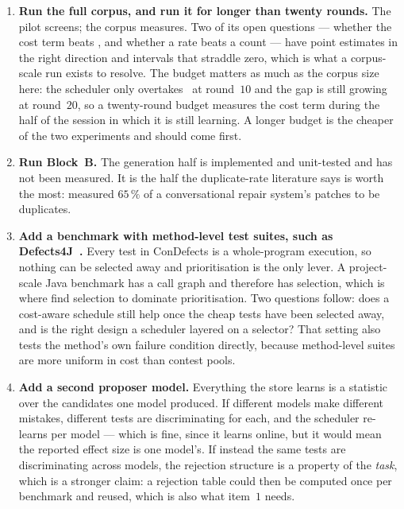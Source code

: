 \begin{enumerate}[leftmargin=*,itemsep=8pt]

\item \textbf{Run the full corpus, and run it for longer than twenty rounds.}
The pilot screens; the corpus measures. Two of its open questions --- whether
the cost term beats \frtp, and whether a rate beats a count --- have point
estimates in the right direction and intervals that straddle zero, which is
what a corpus-scale run exists to resolve. The budget matters as much as the
corpus size here: the scheduler only overtakes \frtp\ at round~$10$ and the
gap is still growing at round~$20$, so a twenty-round budget measures the cost
term during the half of the session in which it is still learning. A longer
budget is the cheaper of the two experiments and should come first.

\item \textbf{Run Block~B.} The generation half is implemented and unit-tested
and has not been measured. It is the half the duplicate-rate literature says is
worth the most: \citet{chen2025conversational} measured $65\,\%$ of a
conversational repair system's patches to be duplicates.

\item \textbf{Add a benchmark with method-level test suites, such as
Defects4J~\citep{just2014defects4j}.} Every test in ConDefects is a
whole-program execution, so nothing can be selected away and prioritisation is
the only lever. A project-scale Java benchmark has a call graph and therefore
has selection, which is where \citet{lou2024aprregression} find selection to
dominate prioritisation. Two questions follow: does a cost-aware schedule still
help once the cheap tests have been selected away, and is the right design a
scheduler layered on a selector? That setting also tests the method's own
failure condition directly, because method-level suites are more uniform in
cost than contest pools.

\item \textbf{Add a second proposer model.} Everything the store learns is a
statistic over the candidates one model produced. If different models make
different mistakes, different tests are discriminating for each, and the
scheduler re-learns per model --- which is fine, since it learns online, but it
would mean the reported effect size is one model's. If instead the same tests
are discriminating across models, the rejection structure is a property of the
\emph{task}, which is a stronger claim: a rejection table could then be
computed once per benchmark and reused, which is also what item~$1$ needs.

\end{enumerate}
